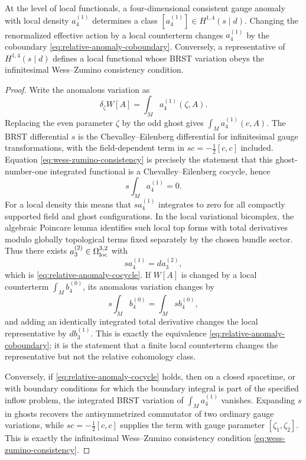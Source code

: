 \begin{proposition}
\label{prop:local-anomalies-relative-brst-classes}
At the level of local functionals, a four-dimensional consistent gauge anomaly
with local density \(a_4^{(1)}\) determines a class
\([a_4^{(1)}]\in H^{1,4}(s\mid d)\).  Changing the renormalized effective
action by a local counterterm changes \(a_4^{(1)}\) by the coboundary
\eqref{eq:relative-anomaly-coboundary}.  Conversely, a representative of
\(H^{1,4}(s\mid d)\) defines a local functional whose BRST variation obeys
the infinitesimal Wess--Zumino consistency condition.
\end{proposition}

\begin{proof}
Write the anomalous variation as
\[
  \delta_\zeta W[A]=\int_M a_4^{(1)}(\zeta,A).
\]
Replacing the even parameter \(\zeta\) by the odd ghost gives
\(\int_M a_4^{(1)}(c,A)\).  The BRST differential \(s\) is the
Chevalley--Eilenberg differential for infinitesimal gauge transformations,
with the field-dependent term in \(s c=-\frac12[c,c]\) included.  Equation
\eqref{eq:wess-zumino-consistency} is precisely the statement that this
ghost-number-one integrated functional is a Chevalley--Eilenberg cocycle,
hence
\[
  s\int_M a_4^{(1)}=0 .
\]
For a local density this means that \(s a_4^{(1)}\) integrates to zero for all
compactly supported field and ghost configurations.  In the local variational
bicomplex, the algebraic Poincare lemma identifies such local top forms with
total derivatives modulo globally topological terms fixed separately by the
chosen bundle sector.  Thus there exists
\(a_3^{(2)}\in\Omega_{\rm loc}^{3,2}\) with
\[
  s a_4^{(1)}=d a_3^{(2)},
\]
which is \eqref{eq:relative-anomaly-cocycle}.  If \(W[A]\) is changed by a
local counterterm \(\int_M b_4^{(0)}\), its anomalous variation changes by
\[
  s\int_M b_4^{(0)}
  =
  \int_M s b_4^{(0)} ,
\]
and adding an identically integrated total derivative changes the local
representative by \(d b_3^{(1)}\).  This is exactly the equivalence
\eqref{eq:relative-anomaly-coboundary}; it is the statement that a finite
local counterterm changes the representative but not the relative cohomology
class.

Conversely, if \eqref{eq:relative-anomaly-cocycle} holds, then on a closed
spacetime, or with boundary conditions for which the boundary integral is part
of the specified inflow problem, the integrated BRST variation of
\(\int_M a_4^{(1)}\) vanishes.  Expanding \(s\) in ghosts recovers the
antisymmetrized commutator of two ordinary gauge variations, while
\(s c=-\frac12[c,c]\) supplies the term with gauge parameter
\([\zeta_1,\zeta_2]\).  This is exactly the infinitesimal
Wess--Zumino consistency condition \eqref{eq:wess-zumino-consistency}.
\end{proof}

